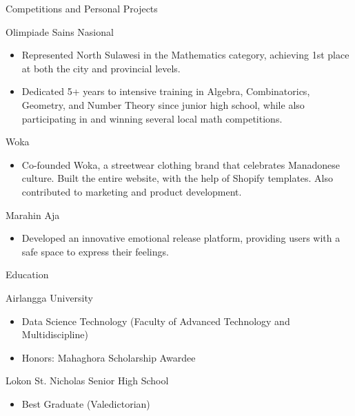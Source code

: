 \documentclass{article}
\newlength{\tabin}
\newlength{\secsep}
\newcommand{\lineunder}{\vspace*{-8pt} \\ \hspace*{-6pt} \hrulefill \\ \vspace*{-15pt}}
\newenvironment{tabbedsection}[1]{
  \begin{list}{}{
      \setlength{\itemsep}{0pt}
      \setlength{\labelsep}{0pt}
      \setlength{\labelwidth}{0pt}
      \setlength{\leftmargin}{\tabin}
      \setlength{\rightmargin}{\tabin}
      \setlength{\listparindent}{0pt}
      \setlength{\parsep}{0pt}
      \setlength{\parskip}{0pt}
      \setlength{\partopsep}{0pt}
      \setlength{\topsep}{#1}
    }
  \item[]
}{\end{list}}
\newenvironment{resume_section}[1]{
  \filbreak
  \vspace{2\secsep}
  \textsc{\large#1}
  \lineunder
  \begin{tabbedsection}{\secsep}
}{\end{tabbedsection}}
\newenvironment{resume_subsection}[2][]{
  \textbf{#2} \hfill {\footnotesize #1} \hspace{2em}
  \begin{tabbedsection}{0.5\secsep}
}{\end{tabbedsection}}
\newenvironment{subitems}{
  \renewcommand{\labelitemi}{-}
  \begin{itemize}
      \setlength{\labelsep}{1em}
}{\end{itemize}}
\begin{document}
\begin{resume_section}{Competitions and Personal Projects}
  \begin{resume_subsection}[(October 2022)]{Olimpiade Sains Nasional}
    \begin{subitems}
      \item Represented North Sulawesi in the Mathematics category, achieving 1st place at both the city and provincial levels.
      \item Dedicated 5+ years to intensive training in Algebra, Combinatorics, Geometry, and Number Theory since junior high school, while also participating in and winning several local math competitions.
     \end{subitems}
  \end{resume_subsection}
 \begin{resume_subsection}[(December 2024)]{Woka}
    \begin{subitems}
      \item Co-founded Woka, a streetwear clothing brand that celebrates Manadonese culture. Built the entire website, with the help of Shopify templates.  Also contributed to marketing and product development.
     \end{subitems}
  \end{resume_subsection}
 \begin{resume_subsection}[(March 2025)]{Marahin Aja}
    \begin{subitems}
      \item Developed an innovative emotional release platform, providing users with a safe space to express their feelings.
     \end{subitems}
  \end{resume_subsection}
\end{resume_section}

\begin{resume_section}{Education}
  \begin{resume_subsection}{Airlangga University}
    \begin{subitems}
      \item Data Science Technology (Faculty of Advanced Technology and Multidiscipline)
      \item Honors: Mahaghora Scholarship Awardee
    \end{subitems}
  \end{resume_subsection}
  
  
  \begin{resume_subsection}{Lokon St. Nicholas Senior High School}
    \begin{subitems}

      \item Best Graduate (Valedictorian)
     \end{subitems}
  \end{resume_subsection}
\end{resume_section}
\end{document}

